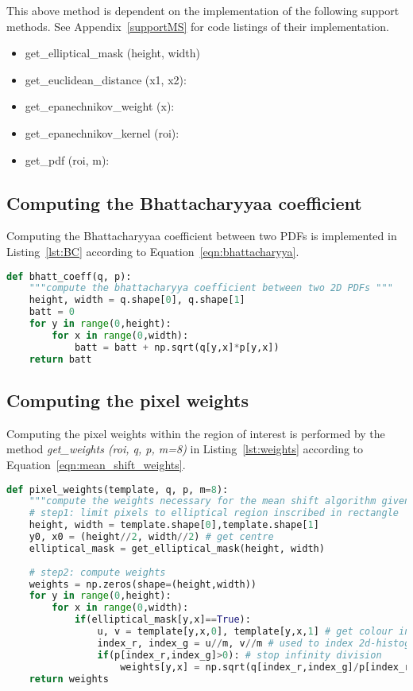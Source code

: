 This above method is dependent on the implementation of the following support
methods. See Appendix~\ref{supportMS} for code listings of their implementation.
\begin{itemize}
    \item get\_elliptical\_mask (height, width)
    \item get\_euclidean\_distance (x1, x2):
    \item get\_epanechnikov\_weight (x):
    \item get\_epanechnikov\_kernel (roi):
    \item get\_pdf (roi, m):
\end{itemize}

\subsection{Computing the Bhattacharyyaa coefficient}
Computing the Bhattacharyyaa coefficient between two PDFs is implemented in
Listing~\ref{lst:BC} according to Equation~\ref{eqn:bhattacharyya}. 

\begin{lstlisting}[language=Python, caption={Function computing the Bhattacharyya coefficient}, captionpos=b, label={lst:BC}]
def bhatt_coeff(q, p):
    """compute the bhattacharyya coefficient between two 2D PDFs """
    height, width = q.shape[0], q.shape[1]
    batt = 0
    for y in range(0,height):
        for x in range(0,width):
            batt = batt + np.sqrt(q[y,x]*p[y,x])
    return batt
\end{lstlisting}

\subsection{Computing the pixel weights}
Computing the pixel weights within the region of interest is performed by the
method \textit{get\_weights (roi, q, p, m=8)} in Listing~\ref{lst:weights} according to Equation~\ref{eqn:mean_shift_weights}.

\begin{lstlisting}[language=Python, caption={Function computing kernel Weights}, captionpos=b, label={lst:weights}]
def pixel_weights(template, q, p, m=8):
    """compute the weights necessary for the mean shift algorithm given q and p"""
    # step1: limit pixels to elliptical region inscribed in rectangle
    height, width = template.shape[0],template.shape[1]
    y0, x0 = (height//2, width//2) # get centre 
    elliptical_mask = get_elliptical_mask(height, width)
    
    # step2: compute weights
    weights = np.zeros(shape=(height,width))
    for y in range(0,height):
        for x in range(0,width): 
            if(elliptical_mask[y,x]==True):  
                u, v = template[y,x,0], template[y,x,1] # get colour index, u 
                index_r, index_g = u//m, v//m # used to index 2d-histogram
                if(p[index_r,index_g]>0): # stop infinity division
                    weights[y,x] = np.sqrt(q[index_r,index_g]/p[index_r,index_g]) # comp weight
    return weights 
\end{lstlisting}

